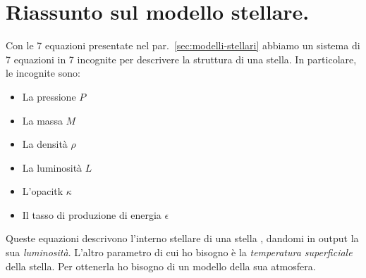 \section{Riassunto sul modello stellare.}
Con le 7 equazioni presentate nel par.~\ref{sec:modelli-stellari} abbiamo un sistema di 7 equazioni in 7 incognite per descrivere la struttura di una stella. In particolare, le incognite sono:
\begin{itemize}
    \item La pressione $P$
    \item La massa $M$
    \item La densità $\rho$
    \item La luminosità $L$
    \item L'opacitk $\kappa$
    \item Il tasso di produzione di energia $\epsilon$
\end{itemize}
Queste equazioni descrivono l'interno stellare di una stella , dandomi in output la sua \emph{luminosità}. L'altro parametro di cui ho bisogno è la \emph{temperatura superficiale} della stella. Per ottenerla ho bisogno di un modello della sua atmosfera.